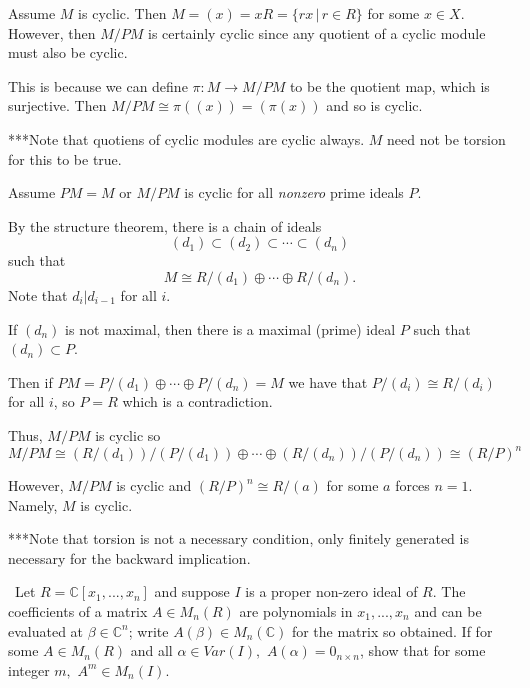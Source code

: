 \documentclass[12pt]{AlgebraQual}
\begin{document}
\begin{solution}$\,$

\boxed{\implies} Assume $M$ is cyclic. Then $M=(x)=xR=\{rx\,|\,r\in R\}$ for some $x\in X$. However, then $M/PM$ is certainly cyclic since any quotient of a cyclic module must also be cyclic.

    This is because we can define $\pi:M\to M/PM$ to be the quotient map, which is surjective. Then $M/PM\cong \pi((x))=(\pi(x))$ and so is cyclic.

    \begin{mybox}
    ***Note that quotiens of cyclic modules are cyclic always. $M$ need not be torsion for this to be true.
    \end{mybox}

    \boxed{\impliedby} Assume $PM=M$ or $M/PM$ is cyclic for all \textit{nonzero} prime ideals $P$.

    By the structure theorem, there is a chain of ideals $$(d_1)\subset(d_2)\subset\cdots\subset(d_n)$$ such that $$M\cong R/(d_1)\oplus\cdots\oplus R/(d_n).$$ Note that $d_i|d_{i-1}$ for all $i$.

    If $(d_n)$ is not maximal, then there is a maximal (prime) ideal $P$ such that $(d_n)\subset P$.

    Then if $PM=P/(d_1)\oplus\cdots\oplus P/(d_n)=M$ we have that $P/(d_i)\cong R/(d_i)$ for all $i$, so $P=R$ which is a contradiction.

    Thus, $M/PM$ is cyclic so $$M/PM\cong (R/(d_1))/(P/(d_1))\oplus\cdots\oplus(R/(d_n))/(P/(d_n))\cong (R/P)^n$$

    However, $M/PM$ is cyclic and $(R/P)^n\cong R/(a)$ for some $a$ forces $n=1.$ Namely, $M$ is cyclic.

    \begin{mybox}
    ***Note that torsion is not a necessary condition, only finitely generated is necessary for the backward implication.
    \end{mybox}
\end{solution}
\newpage



\begin{problem} $\,$
Let $R=\mathbb{C}[x_1,...,x_n]$ and suppose $I$ is a proper non-zero ideal of $R$. The coefficients of a matrix $A\in M_n(R)$ are polynomials in $x_1,...,x_n$ and can be evaluated at $\beta\in\mathbb{C}^n$; write $A(\beta)\in M_n(\mathbb{C})$ for the matrix so obtained. If for some $A\in M_n(R)$ and all $\alpha\in Var(I),$ $A(\alpha)=0_{n\times n}$, show that for some integer $m,$ $A^m\in M_n(I).$
\end{problem}
\end{document}
